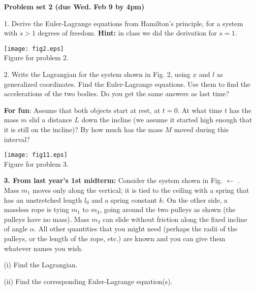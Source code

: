 \documentclass{article}
\begin{document}
\begin{center}{\Large {\bf Problem set 2 (due Wed. Feb 9 by 4pm)}}
\end{center}

\large


1. Derive the Euler-Lagrange equations from Hamilton's principle, for
a system with $s>1$ degrees  of freedom. {\bf Hint:} in class we did the derivation for
$s=1$.

\vspace{3mm}

\noindent\begin{minipage}[b]{80mm}
\centering
\texttt{[image: fig2.eps]}
\small
\\Figure for problem 2.  
\end{minipage}
\hfill
\begin{minipage}[b]{90mm}
2. Write the Lagrangian for the system  shown in Fig. 2, using $x$ and $l$ as
   generalized coordinates. Find the 
   Euler-Lagrange equations. Use them to find the accelerations of the
   two bodies. Do you get the same answers as last time?

   {\bf For fun}: Assume that both objects start at rest, at $t=0$. At what time $t$ has the mass $m$ slid a distance $L$ down the incline (we assume it started high enough that it is still on the incline)? By how much has the mass $M$ moved during this interval?
\end{minipage}

\vspace{5mm}

\noindent
\begin{minipage}[b]{60mm}
\texttt{[image: fig11.eps]}
\\{\small Figure for problem 3.}
\end{minipage}
\hfill
\begin{minipage}[b]{120mm}
  {\bf 3. From last year's 1st midterm:} Consider the system shown in Fig. $\leftarrow$ . Mass $m_1$ moves only along the vertical; it is tied to the ceiling with a  spring that has an unstretched length $l_0$ and a spring constant $k$. On the other side, a massless rope is tying $m_1$ to $m_3$, going around the two pulleys as shown (the pulleys have no mass). Mass $m_3$ can slide without friction along the fixed incline of angle $\alpha$. All other quantities that you might need (perhaps the radii of the pulleys, or the length of the rope, etc.) are known and you can give them whatever names you wish.

  (i) Find the Lagrangian.

  (ii) Find the corresponding Euler-Lagrange equation(s).

\end{minipage}
\end{document}
